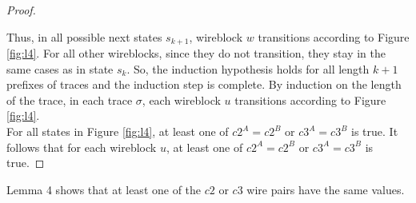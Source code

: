 \documentclass[12pt]{report}
\newtheorem*{lemma}{Lemma}
\begin{document}
\begin{proof}
\begin{itemize}
\end{itemize}
Thus, in all possible next states $s_{k+1}$, wireblock $w$ transitions according to Figure \ref{fig:l4}. For all other wireblocks, since they do not transition, they stay in the same cases as in state $s_k$. So, the induction hypothesis holds for all length $k+1$ prefixes of traces and the induction step is complete. 
By induction on the length of the trace, in each trace $\sigma$, each wireblock $u$ transitions according to Figure \ref{fig:l4}. \\ 

For all states in Figure \ref{fig:l4}, at least one of $c2^A=c2^B$ or $c3^A=c3^B$ is true. It follows that for each wireblock $u$, at least one of $c2^A=c2^B$ or $c3^A=c3^B$ is true.
\end{proof}
Lemma 4 shows that at least one of the $c2$ or $c3$ wire pairs have the same values. \\

\end{document}
